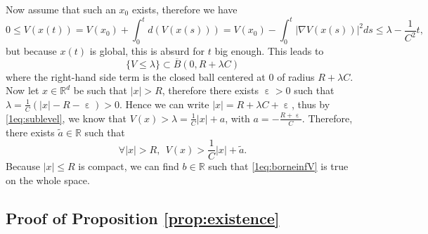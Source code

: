 \documentclass[12pt]{amsart}
\newcommand{\R}{\mathbb R}
\numberwithin{equation}{section}
\numberwithin{figure}{section}
\DeclareMathOperator{\eps}{\varepsilon}
\begin{document}
Now assume that such an $x_0$ exists, therefore we %
have
\begin{equation*}
0\leq V(x(t)) = V(x_0) + \int_0^td(V(x(s))) = V(x_0) - \int_0^t|\nabla V(x(s))|^2ds \leq \lambda - \frac1{C^2}t,
\end{equation*}
but %
because $x(t)$ is global, this is absurd for $t$ big enough. This leads to
\begin{equation}\label{1eq:sublevel}
\{V\leq\lambda\}\subset \overline B(0,R+\lambda C)
\end{equation}
where the right-hand side term is the closed ball centered at $0$ of radius $R+\lambda C$. Now let $x\in\R^d$ be such that $|x| > R$, therefore there exists $\eps>0$ such that $\lambda = \frac1C(|x| - R - \eps) > 0$. Hence we can write $|x| = R + \lambda C + \eps$, thus by \eqref{1eq:sublevel}, we know that $V(x) > \lambda = \frac1C|x| + a$, with $a = -\frac{R+\eps}{C}$. Therefore, there exists $\tilde a\in\R$ such that
\begin{equation}\label{1eq:borneinfV}
\forall |x| > R,\ \ V(x) > \frac1C|x| + \tilde a.
\end{equation}
Because $|x|\leq R$ is compact, we can find $b\in\R$ such that \eqref{1eq:borneinfV} is true on the whole space.










\subsection{Proof of Proposition \ref{prop:existence}}\label{ssec:existence}
\end{document}
